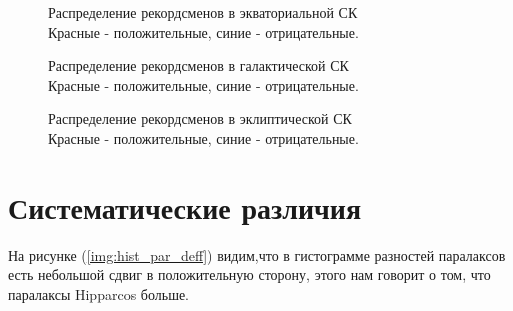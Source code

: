 \documentclass[14pt]{article} %
\begin{document}
\begin{figure}[h!]
\caption{Распределение рекордсменов в экваториальной СК\\Красные - положительные, синие - отрицательные.}
\label{img:75maxradec}
\end{figure}
\begin{figure}[h!]
\caption{Распределение рекордсменов в галактической СК\\Красные - положительные, синие - отрицательные.}
\label{img:75maxlb}
\end{figure}
\begin{figure}[h!]
\caption{Распределение рекордсменов в эклиптической СК\\Красные - положительные, синие - отрицательные.}
\label{img:75maxlonlat}
\end{figure}

\section{Систематические различия}\label{sistem}
На рисунке (\ref{img:hist_par_deff}) видим,что в гистограмме разностей паралаксов есть небольшой сдвиг в положительную сторону, этого нам говорит о том, что паралаксы Hipparcos больше.
\end{document}
